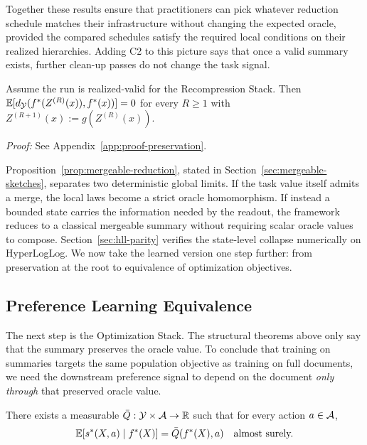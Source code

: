 Together these results ensure that practitioners can pick whatever reduction schedule matches their infrastructure without changing the expected oracle, provided the compared schedules satisfy the required local conditions on their realized hierarchies. Adding C2 to this picture says that once a valid summary exists, further clean-up passes do not change the task signal.

\begin{theorem}\label{thm:multi-round}
Assume the run is realized-valid for the Recompression Stack. Then $\mathbb{E}[d_{\mathcal{Y}}(f^\ast(Z^{(R)}(x)), f^\ast(x))] = 0$ for every $R \geq 1$ with $Z^{(R+1)}(x) := g(Z^{(R)}(x))$.
\end{theorem}

\noindent\textit{Proof:} See Appendix~\ref{app:proof-preservation}.

Proposition~\ref{prop:mergeable-reduction}, stated in Section~\ref{sec:mergeable-sketches}, separates two deterministic global limits. If the task value itself admits a merge, the local laws become a strict oracle homomorphism. If instead a bounded state carries the information needed by the readout, the framework reduces to a classical mergeable summary without requiring scalar oracle values to compose. Section~\ref{sec:hll-parity} verifies the state-level collapse numerically on HyperLogLog. We now take the learned version one step further: from preservation at the root to equivalence of optimization objectives.

\subsection{Preference Learning Equivalence}

The next step is the Optimization Stack. The structural theorems above only say that the summary preserves the oracle value. To conclude that training on summaries targets the same population objective as training on full documents, we need the downstream preference signal to depend on the document \emph{only through} that preserved oracle value.

\begin{assumption}\label{ass:CF}
There exists a measurable $\bar{Q}: \mathcal{Y} \times \mathcal{A} \to \mathbb{R}$ such that for every action $a \in \mathcal{A}$,
\[
\mathbb{E}\!\left[s^\ast(X, a) \mid f^\ast(X)\right] = \bar{Q}(f^\ast(X), a) \quad \text{almost surely.}
\]
\end{assumption}

